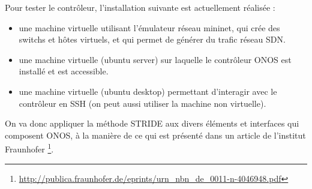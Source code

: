 Pour tester le contrôleur, l’installation suivante est actuellement réalisée :
\begin{itemize}

\item une machine virtuelle utilisant l'émulateur réseau mininet, qui crée des switchs et hôtes virtuels, et qui permet de générer du trafic réseau SDN.
\item une machine virtuelle (ubuntu server) sur laquelle le contrôleur ONOS est installé et est accessible.
\item une machine virtuelle (ubuntu desktop) permettant d’interagir avec le contrôleur en SSH (on peut aussi utiliser la machine non virtuelle).
\end{itemize}

On va donc appliquer la méthode STRIDE aux divers éléments et interfaces qui composent ONOS, à la manière de ce qui est présenté dans un article de l'institut Fraunhofer \footnote{\url{http://publica.fraunhofer.de/eprints/urn_nbn_de_0011-n-4046948.pdf}}.
